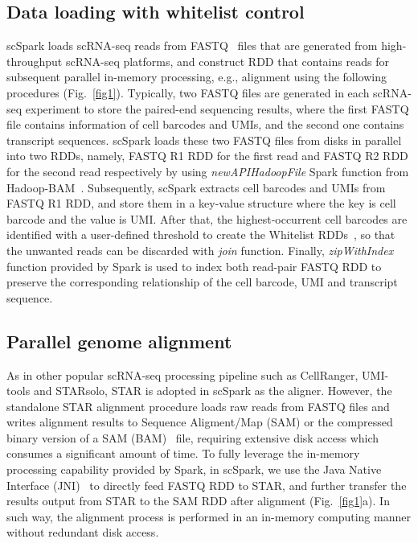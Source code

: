 \documentclass[conference]{IEEEtran}
\begin{document}
\subsection{Data loading with whitelist control}
scSpark loads scRNA-seq reads from FASTQ~\cite{cock2010sanger} files that are generated from high-throughput scRNA-seq platforms, and construct RDD that contains reads for subsequent parallel in-memory processing, e.g., alignment using the following procedures (Fig.~\ref{fig1}). Typically, two FASTQ files are generated in each scRNA-seq experiment to store the paired-end sequencing results, where the first FASTQ file contains information of cell barcodes and UMIs, and the second one contains transcript sequences.
scSpark loads these two FASTQ files from disks in parallel into two RDDs, namely, FASTQ R1 RDD for the first read and FASTQ R2 RDD for the second read respectively by using \textit{newAPIHadoopFile} Spark function from Hadoop-BAM~\cite{hadoopBAM}.
Subsequently, scSpark extracts cell barcodes and UMIs from FASTQ R1 RDD, and store them in a key-value structure where the key is cell barcode and the value is UMI. After that, the highest-occurrent cell barcodes are identified with a user-defined threshold to create the Whitelist RDDs~\cite{guo2018bioinformatics}, so that the unwanted reads can be discarded with \textit{join} function. Finally, \textit{zipWithIndex} function provided by Spark is used to index both read-pair FASTQ RDD to preserve the corresponding relationship of the cell barcode, UMI and transcript sequence.

\subsection{Parallel genome alignment}

As in other popular scRNA-seq processing pipeline such as CellRanger, UMI-tools and STARsolo, STAR is adopted in scSpark as the aligner. However, the standalone STAR alignment procedure loads raw reads from FASTQ files and writes alignment results to Sequence Aligment/Map (SAM) or the compressed binary version of a SAM (BAM)~\cite{li2009sequence} file, requiring extensive disk access which consumes a significant amount of time. To fully leverage the in-memory processing capability provided by Spark, in scSpark, we use the Java Native Interface (JNI)~\cite{kim2012benchmarking} to directly feed FASTQ RDD to STAR, and further transfer the results output from STAR to the SAM RDD after alignment (Fig.~\ref{fig1}a). 
In such way, the alignment process is performed in an in-memory computing manner without redundant disk access. 
\end{document}
